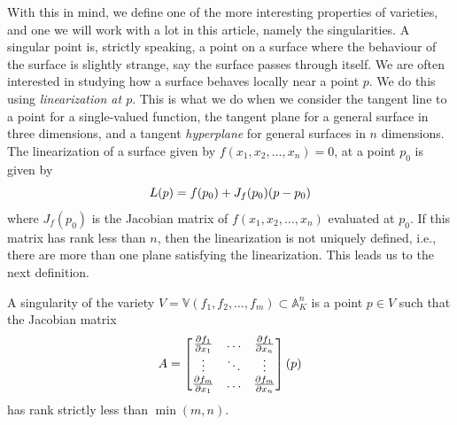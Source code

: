 \documentclass{article}
\newcommand{\A}{\ensuremath{\mathbb{A}}}
\newcommand{\V}{\ensuremath{\mathbb{V}}}
\begin{document}
    With this in mind, we define one of the more interesting properties of
    varieties, and one we will work with a lot in this article, namely the
    singularities. A singular point is, strictly speaking, a point on a surface
    where the behaviour of the surface is slightly strange, say the surface
    passes through itself. We are often interested in studying how a surface
    behaves locally near a point $p$. We do this using \emph{linearization at
    $p$}. This is what we do when we consider the tangent line to a point for a
    single-valued function, the tangent plane for a general surface in three
    dimensions, and a tangent \emph{hyperplane} for general surfaces in $n$
    dimensions. The linearization of a surface given by $f(x_1, x_2, \ldots,
    x_n) = 0$, at a point $p_0$ is given by
    \begin{equation}
        \notag
        L(p) = f(p_0) + J_f(p_0)(p - p_0)
    \end{equation}
    where $J_f(p_0)$ is the Jacobian matrix of $f(x_1, x_2, \ldots, x_n)$
    evaluated at $p_0$. If this matrix has rank less than $n$, then the
    linearization is not uniquely defined, i.e., there are more than one plane
    satisfying the linearization. This leads us to the next definition.
    
    \begin{definition}
        A singularity of the variety $V = \V(f_1, f_2, \ldots, f_m) \subset
        \A_K^n$ is a point $p \in V$ such that the Jacobian matrix
        \begin{equation}
            \notag
            A = \begin{bmatrix}
                \frac{\partial f_1}{\partial x_1} & \hdots & \frac{\partial f_1}{\partial x_n} \\
                \vdots & \ddots & \vdots \\
                \frac{\partial f_m}{\partial x_1} & \hdots & \frac{\partial f_m}{\partial x_n}
            \end{bmatrix}(p)
        \end{equation}
        has rank strictly less than $\min(m, n)$.
    \end{definition}
\end{document}
